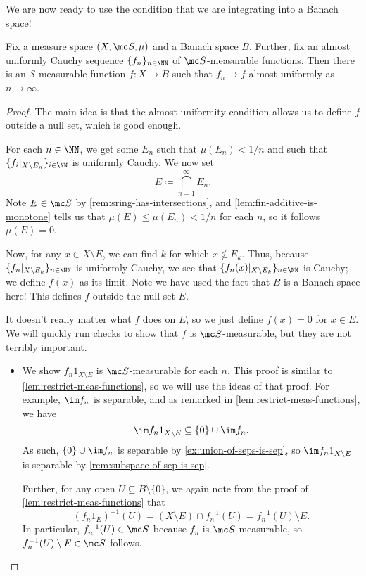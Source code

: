 \documentclass[../notes.tex]{subfiles}
\begin{document}
We are now ready to use the condition that we are integrating into a Banach space!
\begin{lemma} \label{lem:almost-uniform-cauchy-converges}
	Fix a measure space $(X,\mc S,\mu)$ and a Banach space $B$. Further, fix an almost uniformly Cauchy sequence $\{f_n\}_{n\in\NN}$ of $\mc S$-measurable functions. Then there is an $\mathcal S$-measurable function $f\colon X\to B$ such that $f_n\to f$ almost uniformly as $n\to\infty$.
\end{lemma}
\begin{proof}
	The main idea is that the almost uniformity condition allows us to define $f$ outside a null set, which is good enough.

	For each $n\in\NN$, we get some $E_n$ such that $\mu(E_n)<1/n$ and such that $\{f_i|_{X\setminus E_n}\}_{i\in\NN}$ is uniformly Cauchy. We now set
	\[E\coloneqq\bigcap_{n=1}^\infty E_n.\]
	Note $E\in\mc S$ by \autoref{rem:sring-has-intersections}, and \autoref{lem:fin-additive-is-monotone} tells us that $\mu(E)\le\mu(E_n)<1/n$ for each $n$, so it follows $\mu(E)=0$.

	Now, for any $x\in X\setminus E$, we can find $k$ for which $x\notin E_k$. Thus, because $\{f_n|_{X\setminus E_k}\}_{n\in\NN}$ is uniformly Cauchy, we see that $\{f_n(x)|_{X\setminus E_k}\}_{n\in\NN}$ is Cauchy; we define $f(x)$ as its limit. Note we have used the fact that $B$ is a Banach space here! This defines $f$ outside the null set $E$.
	
	It doesn't really matter what $f$ does on $E$, so we just define $f(x)=0$ for $x\in E$. We will quickly run checks to show that $f$ is $\mc S$-measurable, but they are not terribly important.
	\begin{itemize}
		\item We show $f_n1_{X\setminus E}$ is $\mc S$-measurable for each $n$. This proof is similar to \autoref{lem:restrict-meas-functions}, so we will use the ideas of that proof. For example, $\im f_n$ is separable, and as remarked in \autoref{lem:restrict-meas-functions}, we have
		\[\im f_n1_{X\setminus E}\subseteq\{0\}\cup\im f_n.\]
		As such, $\{0\}\cup\im f_n$ is separable by \autoref{ex:union-of-seps-is-sep}, so $\im f_n1_{X\setminus E}$ is separable by \autoref{rem:subspace-of-sep-is-sep}.

		Further, for any open $U\subseteq B\setminus\{0\}$, we again note from the proof of \autoref{lem:restrict-meas-functions} that
		\[(f_n1_E)^{-1}(U)=(X\setminus E)\cap f_n^{-1}(U)=f_n^{-1}(U)\setminus E.\]
		In particular, $f_n^{-1}(U)\in\mc S$ because $f_n$ is $\mc S$-measurable, so $f_n^{-1}(U)\setminus E\in\mc S$ follows.


\end{itemize}
\end{proof}
\end{document}
